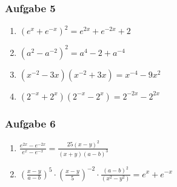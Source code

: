 \subsubsection{Aufgabe 5} 
\begin{enumerate}
	\item \quad $ (e^x+e^{-x})^2 =e^{2x}+e^{-2x}+2 $	%
	\item \quad $ (a^2-a^{-2})^2 =a^4 - 2 +a^{-4} $		%
	\item \quad $ (x^{-2}-3x)(x^{-2}+3x) =x^{-4}-9x^2 $				%
	\item \quad $ (2^{-x}+2^x)(2^{-x}-2^x) =2^{-2x}-2^{2x} $		%
\end{enumerate}

\subsubsection{Aufgabe 6} 
\begin{enumerate}
	\item \quad $\frac{e^{2x}-e^{-2x}}{e^x-e^{-x}} =\frac{25(x-y)^2}{(x+y)(a-b)^3} $	%
	\item \quad $\left(\frac{x-y}{a-b}\right)^5 \cdot \left(\frac{x-y}{5}\right)^{-2} \cdot \frac{(a-b)^2}{(x^2-y^2)}= e^x + e^{-x} $									%
\end{enumerate}